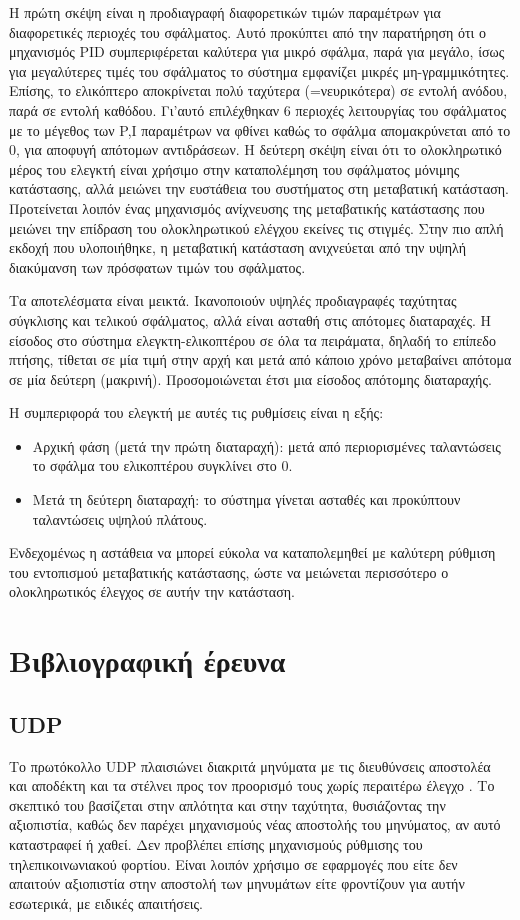 \documentclass[a4paper,10pt]{article}
\begin{document}
Η πρώτη σκέψη είναι η προδιαγραφή διαφορετικών τιμών παραμέτρων για διαφορετικές περιοχές του σφάλματος. Αυτό προκύπτει από την παρατήρηση ότι ο μηχανισμός PID συμπεριφέρεται καλύτερα για μικρό σφάλμα, παρά για μεγάλο, ίσως για μεγαλύτερες τιμές του σφάλματος το σύστημα εμφανίζει μικρές μη-γραμμικότητες. Επίσης, το ελικόπτερο αποκρίνεται πολύ ταχύτερα (=νευρικότερα) σε εντολή ανόδου, παρά σε εντολή καθόδου. Γι'αυτό επιλέχθηκαν 6 περιοχές λειτουργίας του σφάλματος με το μέγεθος των \foreignlanguage{english}{P,I} παραμέτρων να φθίνει καθώς το σφάλμα απομακρύνεται από το 0, για αποφυγή απότομων αντιδράσεων.
Η δεύτερη σκέψη είναι ότι το ολοκληρωτικό μέρος του ελεγκτή είναι χρήσιμο στην καταπολέμηση του σφάλματος μόνιμης κατάστασης, αλλά μειώνει την ευστάθεια του συστήματος στη μεταβατική κατάσταση. Προτείνεται λοιπόν ένας μηχανισμός ανίχνευσης της μεταβατικής κατάστασης που μειώνει την επίδραση του ολοκληρωτικού ελέγχου εκείνες τις στιγμές. Στην πιο απλή εκδοχή που υλοποιήθηκε, η μεταβατική κατάσταση ανιχνεύεται από την υψηλή διακύμανση των πρόσφατων τιμών του σφάλματος.

Τα αποτελέσματα είναι μεικτά. Ικανοποιούν υψηλές προδιαγραφές ταχύτητας σύγκλισης και τελικού σφάλματος, αλλά είναι ασταθή στις απότομες διαταραχές. Η είσοδος στο σύστημα ελεγκτη-ελικοπτέρου σε όλα τα πειράματα, δηλαδή το επίπεδο πτήσης, τίθεται σε μία τιμή στην αρχή και μετά από κάποιο χρόνο μεταβαίνει απότομα σε μία δεύτερη (μακρινή). Προσομοιώνεται έτσι μια είσοδος απότομης διαταραχής.

Η συμπεριφορά του ελεγκτή με αυτές τις ρυθμίσεις είναι η εξής:
\begin{itemize}
  \item Αρχική φάση (μετά την πρώτη διαταραχή): μετά από περιορισμένες ταλαντώσεις το σφάλμα του ελικοπτέρου συγκλίνει στο 0.
	\item Μετά τη δεύτερη διαταραχή: το σύστημα γίνεται ασταθές και προκύπτουν ταλαντώσεις υψηλού πλάτους.
\end{itemize}
Ενδεχομένως η αστάθεια να μπορεί εύκολα να καταπολεμηθεί με καλύτερη ρύθμιση του εντοπισμού μεταβατικής κατάστασης, ώστε να μειώνεται περισσότερο ο ολοκληρωτικός έλεγχος σε αυτήν την κατάσταση.

\section{Βιβλιογραφική έρευνα}
\subsection{\foreignlanguage{english}{UDP}}
Το πρωτόκολλο \foreignlanguage{english}{UDP} πλαισιώνει διακριτά μηνύματα με τις διευθύνσεις αποστολέα και αποδέκτη και τα στέλνει προς τον προορισμό τους χωρίς περαιτέρω έλεγχο \cite{udp-ietf}. Το σκεπτικό του βασίζεται στην απλότητα και στην ταχύτητα, θυσιάζοντας την αξιοπιστία, καθώς δεν παρέχει μηχανισμούς νέας αποστολής του μηνύματος, αν αυτό καταστραφεί ή χαθεί. Δεν προβλέπει επίσης μηχανισμούς ρύθμισης του τηλεπικοινωνιακού φορτίου. Είναι λοιπόν χρήσιμο σε εφαρμογές που είτε δεν απαιτούν αξιοπιστία στην αποστολή των μηνυμάτων είτε φροντίζουν για αυτήν εσωτερικά, με ειδικές απαιτήσεις.
\end{document}
